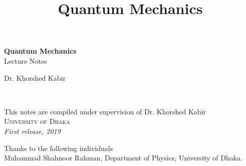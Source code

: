 \documentclass[11pt,fleqn]{book} %
\begin{document}
\title{Quantum Mechanics}


\begingroup
\thispagestyle{empty}
\centering
\vspace*{5cm}
\par\normalfont\fontsize{35}{35}\sffamily\selectfont
\textbf{Quantum Mechanics}\\
{\LARGE Lecture Notes}\par %
\vspace*{1cm}
{\Huge Dr. Khorshed Kabir}\par %
\endgroup


\newpage
~\vfill
\thispagestyle{empty}





{\noindent This notes are compiled under supervision of Dr. Khorshed Kabir}\\ %

{\noindent \textsc{University of Dhaka}}\\

{\noindent \textit{First release, %
	 2019}} %


\newpage


Thanks to the following individuals \\
{\centering
Muhammad Shahnoor Rahman, Department of Physics, University of Dhaka.\\}



\end{document}
